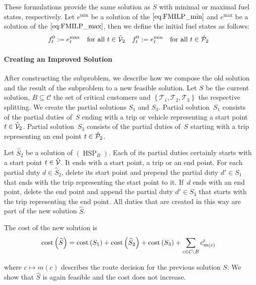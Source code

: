 These formulations provide the same solution as $S$ with minimal or maximal fuel states, respectively. Let $e^{\min}$ be a solution of the $\eqref{eq:FMILP_min}$ and $e^{\max}$ be a solution of the $\eqref{eq:FMILP_max}$, then we define the initial fuel states as follows:
\begin{align*}
	f^0_t := e^{\max}_t && \text{for all } t\in\hat{\mathcal{V}}_2 && f^0_t := e^{\min}_t && \text{for all } t\in\hat{\mathcal{P}}_2
\end{align*}

\paragraph{Creating an Improved Solution} \parfill

After constructing the subproblem, we describe how we compose the old solution and the result of the subproblem to a new feasible solution. Let $S$ be the current solution, $B\subseteq\mathcal{C}$ the set of critical customers and $\left\{\mathcal{T}_1,\mathcal{T}_2,\mathcal{T}_3\right\}$ the respective splitting. We create the partial solutions $S_1$ and $S_3$. Partial solution~$S_1$ consists of the partial duties of~$S$ ending with a trip or vehicle representing a start point ${t\in\hat{\mathcal{V}}_2}$. Partial solution~$S_3$ consists of the partial duties of~$S$ starting with a trip representing an end point ${t\in\hat{\mathcal{P}}_2}$. 

Let $\widehat{S}_2$ be a solution of $(\operatorname{HSP}_B)$. Each of its partial duties certainly starts with a start point ${t\in\hat{\mathcal{V}}}$. It ends with a start point, a trip or an end point. For each partial duty ${d\in\widehat{S}_2}$, delete its start point and prepend the partial duty ${d'\in S_1}$ that ends with the trip representing the start point to it. If~$d$ ends with an end point, delete the end point and append the partial duty ${d'\in S_3}$ that starts with the trip representing the end point. All duties that are created in this way are part of the new solution $\widehat{S}$. 

The cost of the new solution is
\begin{align*}
	\operatorname{cost}\left(\widehat{S}\right) = \operatorname{cost}\left(S_1\right) + \operatorname{cost}\left(\widehat{S}_2\right) + \operatorname{cost}\left(S_3\right) + \sum_{c\in\mathcal{C}\backslash B} c^{\operatorname{r}}_{m(c)}
\end{align*}

where ${c\mapsto m(c)}$ describes the route decision for the previous solution $S$. We show that $\widehat{S}$ is again feasible and the cost does not increase.

